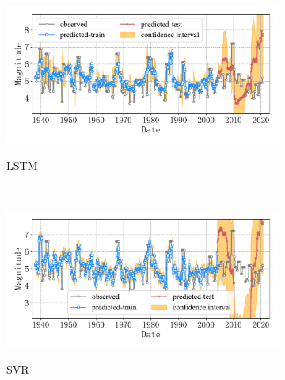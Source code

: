 \begin{figure}[!htbp]
  \centering
  \begin{subfigure}[b]{0.45\textwidth}
    \caption{LSTM}
    \vspace{-0.2cm}
    \includegraphics[width=\textwidth]{Img/chap5_seism/block5/seism_lstm_minyear_1932_maxyear_2021_spanlat_2_spanlon_4_timewindow_72_nextmonth_12_minmag_3.0_block_5.pdf}
    \vspace{-1cm}
    \label{fig:seism_lstm_minyear_1932_maxyear_2021_spanlat_2_spanlon_4_timewindow_72_nextmonth_12_minmag_3.0_block_5}
  \end{subfigure}
  ~
  \begin{subfigure}[b]{0.45\textwidth}
    \caption{SVR} 
    \vspace{-0.2cm}
    \includegraphics[width=\textwidth]{Img/chap5_seism/block5/seism_svr_minyear_1932_maxyear_2021_spanlat_2_spanlon_4_timewindow_72_nextmonth_12_minmag_3.0_block_5.pdf}
    \vspace{-1cm}
    \label{fig:seism_svr_minyear_1932_maxyear_2021_spanlat_2_spanlon_4_timewindow_72_nextmonth_12_minmag_3.0_block_5}
  \end{subfigure}   
  \\
  \begin{subfigure}[b]{0.45\textwidth}

\end{subfigure}
\end{figure}
